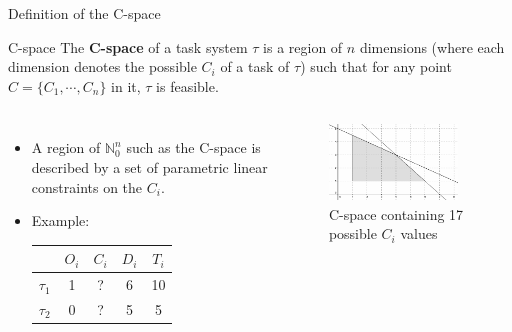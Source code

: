 \documentclass{beamer}
\begin{document}
    \begin{frame}{Definition of the C-space}
        \begin{block}{C-space}
            The \textbf{C-space} of a task system $\tau$ is a region of $n$ dimensions (where each dimension denotes the possible $C_i$ of a task of $\tau$) such that for any point $C = \{ C_1, \cdots, C_{n}\}$ in it, $\tau$ is feasible.
        \end{block}

\begin{columns}[c]
        \begin{itemize}
            \item A region of $\mathbb{N}_0^n$ such as the C-space is described by a set of parametric linear constraints on the $C_i$.
            \item Example:
            \begin{tabular}{|r|c|c|c|c|}
             \hline
              & $O_i$ & $C_i$ & $D_i$ & $T_i$ \\
             \hline
             $\tau_1$ & 1 & ? & 6 & 10\\
             \hline
             $\tau_2$ & 0 & ? & 5 & 5\\
             \hline
            \end{tabular}
        \end{itemize}
        \begin{center}
        \begin{figure}
            \includegraphics[width=0.9\textwidth]{figs/cspace_example_2.png}
            \caption{C-space containing 17 possible $C_i$ values}
        \end{figure}
        \end{center}

    \end{columns}
    \end{frame}
\end{document}
